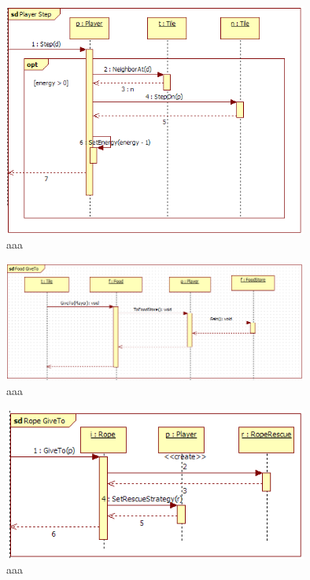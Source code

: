 \begin{figure}[H]
	\begin{center}
		\includegraphics[width=10cm]{chapters/chapter03/seqdiag/Player_Step.png}
		\caption{aaa}
		\label{bbb}
	\end{center}
\end{figure}
\begin{figure}[H]
	\begin{center}
		\includegraphics[width=10cm]{chapters/chapter03/seqdiag/Food_GiveTo.png}
		\caption{aaa}
		\label{bbb}
	\end{center}
\end{figure}
\begin{figure}[H]
	\begin{center}
		\includegraphics[width=10cm]{chapters/chapter03/seqdiag/Rope_GiveTo.png}
		\caption{aaa}
		\label{bbb}
	\end{center}
\end{figure}
